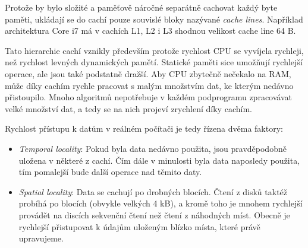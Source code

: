 Protože by bylo složité a paměťově náročné separátně cachovat každý byte paměti,
ukládají se do cachí pouze souvislé bloky nazývané \textsl{cache lines}.
Například architektura Core i7 má v cachích L1, L2 i L3 shodnou velikost cache
line 64 B.

Tato hierarchie cachí vznikly především protože rychlost CPU se vyvíjela rychleji,
než rychlost levných dynamických pamětí. Statické paměti sice umožňují rychlejší
operace, ale jsou také podstatně dražší. Aby CPU zbytečně nečekalo na RAM, může
díky cachím rychle pracovat s malým množstvím dat, ke kterým nedávno přistoupilo.
Mnoho algoritmů nepotřebuje v každém podprogramu zpracovávat velké množství dat,
a tedy se na nich projeví zrychlení díky cachím.

Rychlost přístupu k datům v reálném počítači je tedy řízena dvěma faktory:
\begin{itemize}
\item
	\textit{Temporal locality}: Pokud byla data nedávno použita, jsou
	pravděpodobně uložena v některé z cachí. Čím dále v minulosti byla
	data naposledy použita, tím pomalejší bude další operace nad těmito
	daty.
\item
	\textit{Spatial locality}: Data se cachují po drobných blocích. Čtení
	z disků taktéž probíhá po blocích (obvykle velkých 4 kB), a kromě
	toho je mnohem rychlejší provádět na discích sekvenční čtení než čtení
	z náhodných míst. Obecně je rychlejší přistupovat k údajům uloženým
	blízko místa, které právě upravujeme.
\end{itemize}

